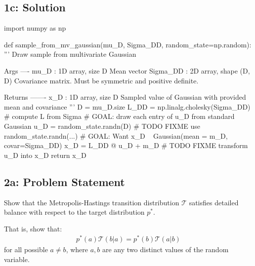 \documentclass[10pt]{article}
\newcommand{\officialdirections}[1]{{\color{purple} #1}}
\begin{document}
\subsection{1c: Solution}
\begin{python}
import numpy as np

def sample_from_mv_gaussian(mu_D, Sigma_DD, random_state=np.random):
	''' Draw sample from multivariate Gaussian

	Args
	----
	mu_D : 1D array, size D
		Mean vector
	Sigma_DD : 2D array, shape (D, D)
		Covariance matrix. Must be symmetric and positive definite.

	Returns
	-------
	x_D : 1D array, size D
		Sampled value of Gaussian with provided mean and covariance
	'''
	D = mu_D.size
	L_DD = np.linalg.cholesky(Sigma_DD) # compute L from Sigma
	# GOAL: draw each entry of u_D from standard Gaussian 
	u_D = random_state.randn(D) # TODO FIXME use random_state.randn(...)
	# GOAL: Want x_D ~ Gaussian(mean = m_D, covar=Sigma_DD)
	x_D = L_DD @ u_D + m_D # TODO FIXME transform u_D into x_D 
	return x_D
\end{python}



\officialdirections{
\subsection*{2a: Problem Statement}
Show that the Metropolis-Hastings transition distribution $\mathcal{T}$ satisfies detailed balance with respect to the target distribution $p^*$. 

That is, show that:
\begin{align}
p^*( a) \mathcal{T}( b | a)  = p^*(b) \mathcal{T}( a | b)
\end{align}
for all possible $a \neq b$, where $a, b$ are any two distinct values of the random variable.
}
\end{document}
